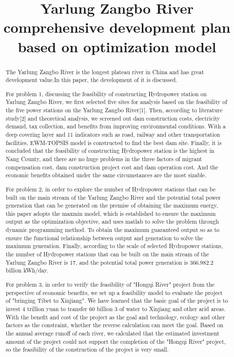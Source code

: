 \documentclass[12pt]{article}  %
\title{Yarlung Zangbo River comprehensive development plan based on optimization model}  %
\begin{document}
\begin{abstract}
\setlength{\parindent}{2em}
	
	The Yarlung Zangbo River is the longest plateau river in China and has great development value.In this paper, the development of it is discussed.
	
	For problem 1, discussing the feasibility of constructing Hydropower station on Yarlung Zangbo River, we first selected five sites for analysis based on the feasibility of the five power stations on the Yarlung Zangbo River[1]. Then, according to literature study[2] and theoretical analysis, we screened out dam construction costs, electricity demand, tax collection, and benefits from improving environmental conditions. With a deep covering layer and 11 indicators such as road, railway and other transportation facilities, EWM-TOPSIS model is constructed to find the best dam site. Finally, it is concluded that the feasibility of constructing Hydropower station is the highest in Nang County, and there are no huge problems in the three factors of migrant compensation cost, dam construction project cost and dam operation cost. And the economic benefits obtained under the same circumstances are the most sizable. 

	For problem 2, in order to explore the number of Hydropower stations that can be built on the main stream of the Yarlung Zangbo River and the potential total power generation that can be generated on the premise of obtaining the maximum energy, this paper adopts the maxmin model, which is established to ensure the maximum output as the optimization objective, and uses matlab to solve the problem through dynamic programming method. To obtain the maximum guaranteed output so as to ensure the functional relationship between output and generation to solve the maximum generation. Finally, according to the scale of selected Hydropower stations, the number of Hydropower stations that can be built on the main stream of the Yarlung Zangbo River is 17, and the potential total power generation is 366.982.2 billion kWh/day.

	For problem 3, in order to verify the feasibility of "Hongqi River" project from the perspective of economic benefits, we set up a feasibility model to evaluate the project of "bringing Tibet to Xinjiang". We have learned that the basic goal of the project is to invest 4 trillion yuan to transfer 60 billion 3 of water to Xinjiang and other arid areas. With the benefit and cost of the project as the goal and technology, ecology and other factors as the constraint, whether the reverse calculation can meet the goal. Based on the annual average runoff of each river, we calculated that the estimated investment amount of the project could not support the completion of the "Hongqi River" project, so the feasibility of the construction of the project is very small.


\end{abstract}
\end{document}
